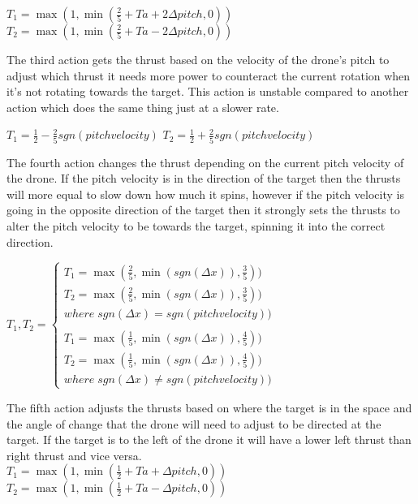 \begingroup\centering
$T_1 = \max (1,\min (\frac{2}{5}+Ta+2\Delta pitch,0))$
$T_2 = \max (1,\min (\frac{2}{5}+Ta-2\Delta pitch,0))$

\endgroup

The third action gets the thrust based on the velocity of the drone's pitch to adjust which thrust it needs more power to counteract the current rotation when it’s not rotating towards the target. This action is unstable compared to another action which does the same thing just at a slower rate.

\begingroup\centering

$T_1 = \frac{1}{2} - \frac{2}{5} sgn (pitchvelocity)$
$T_2 = \frac{1}{2} + \frac{2}{5} sgn (pitchvelocity)$

\endgroup

The fourth action changes the thrust depending on the current pitch velocity of the drone. If the pitch velocity is in the direction of the target then the thrusts will more equal to slow down how much it spins, however if the pitch velocity is going in the opposite direction of the target then it strongly sets the thrusts to alter the pitch velocity to be towards the target, spinning it into the correct direction.

\begingroup\centering
$
T_1, T_2 = 
\left\{\begin{matrix}
    T_1 = \max (\frac{2}{5},\min (sgn(\Delta x)),\frac{3}{5})) \\
    T_2 = \max (\frac{2}{5},\min (sgn(\Delta x)),\frac{3}{5}))
    \\ where\;sgn(\Delta x) = sgn(pitchvelocity))
    \\ \\
    T_1 = \max (\frac{1}{5},\min (sgn(\Delta x)),\frac{4}{5})) \\
    T_2 = \max (\frac{1}{5},\min (sgn(\Delta x)),\frac{4}{5}))
    \\ where\;sgn(\Delta x) \neq sgn(pitchvelocity))

    \end{matrix}\right.$
\break
\endgroup

The fifth action adjusts the thrusts based on where the target is in the space and the angle of change that the drone will need to adjust to be directed at the target. If the target is to the left of the drone it will have a lower left thrust than right thrust and vice versa. 
\\
\begingroup\centering
$T_1 = \max (1,\min (\frac{1}{2}+Ta+\Delta pitch,0))$
$T_2 = \max (1,\min (\frac{1}{2}+Ta-\Delta pitch,0))$

